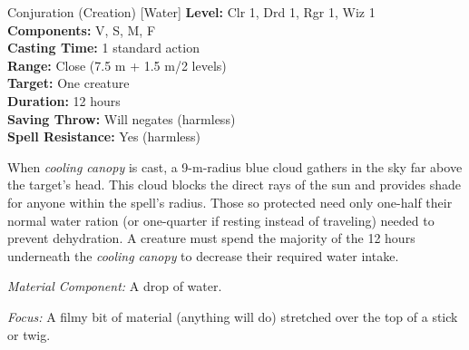 {Conjuration (Creation) [Water]}
{
	\textbf{Level:}
	Clr 1, Drd 1, Rgr 1, Wiz 1\\
	\textbf{Components:}
	V, S, M, F\\
	\textbf{Casting Time:}
	1 standard action\\
	\textbf{Range:}
	Close (7.5 m + 1.5 m/2 levels)\\
	\textbf{Target:}
	One creature\\
	\textbf{Duration:}
	12 hours\\
	\textbf{Saving Throw:}
	Will negates (harmless)\\
	\textbf{Spell Resistance:}
	Yes (harmless)\\
}
{
	When \emph{cooling canopy} is cast, a 9-m-radius blue cloud gathers in the sky far above the target's head. This cloud blocks the direct rays of the sun and provides shade for anyone within the spell's radius. Those so protected need only one-half their normal water ration (or one-quarter if
	resting instead of traveling) needed to prevent dehydration. A creature must spend the majority of the 12 hours underneath the \emph{cooling canopy} to decrease their required water intake.

	\textit{Material Component:} A drop of water.

	\textit{Focus:} A filmy bit of material (anything will do) stretched over the top of a stick or twig.
}
